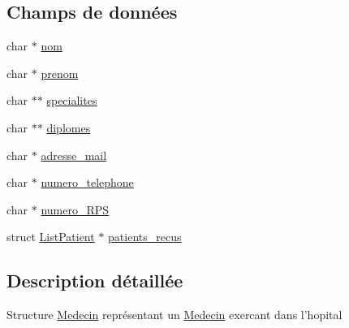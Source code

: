 \subsection*{Champs de données}
\begin{DoxyCompactItemize}
\item 
char $\ast$ \hyperlink{struct_medecin_abe308d273ff51ad86ff02ef3ba3b6f0e}{nom}
\item 
char $\ast$ \hyperlink{struct_medecin_aa7d0e9e8505d2ac627777c4168573ec9}{prenom}
\item 
char $\ast$$\ast$ \hyperlink{struct_medecin_a65fe6337893c03f2e41cba9f4fe45dd0}{specialites}
\item 
char $\ast$$\ast$ \hyperlink{struct_medecin_a30acb0c2b918d1f2a3bac4b758474832}{diplomes}
\item 
char $\ast$ \hyperlink{struct_medecin_aefa944e4b78fb9e14c4f6e49605bba2c}{adresse\-\_\-mail}
\item 
char $\ast$ \hyperlink{struct_medecin_ac65f93b2b15c34c800c05832e346c98f}{numero\-\_\-telephone}
\item 
char $\ast$ \hyperlink{struct_medecin_aef3cdf238a67d175fecba3f7df4e6828}{numero\-\_\-\-R\-P\-S}
\item 
struct \hyperlink{struct_list_patient}{List\-Patient} $\ast$ \hyperlink{struct_medecin_ad1dc0fd5fced379618573f857d441736}{patients\-\_\-recus}
\end{DoxyCompactItemize}


\subsection{Description détaillée}
Structure \hyperlink{struct_medecin}{Medecin} représentant un \hyperlink{struct_medecin}{Medecin} exercant dans l'hopital 

